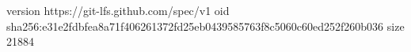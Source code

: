 version https://git-lfs.github.com/spec/v1
oid sha256:e31e2fdbfea8a71f406261372fd25eb0439585763f8c5060c60ed252f260b036
size 21884
